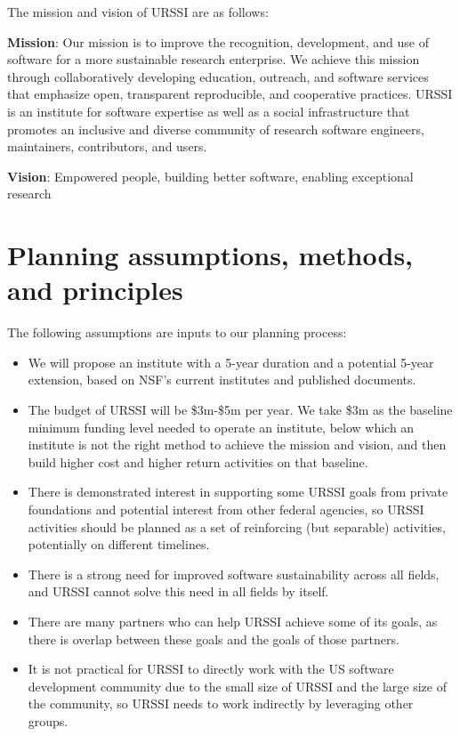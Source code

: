\documentclass[
]{book}
\begin{document}
The mission and vision of URSSI are as follows:

\textbf{Mission}: Our mission is to improve the recognition, development, and use of
software for a more sustainable research enterprise. We achieve this mission
through collaboratively developing education, outreach, and software services
that emphasize open, transparent reproducible, and cooperative practices. URSSI
is an institute for software expertise as well as a social infrastructure that
promotes an inclusive and diverse community of research software engineers,
maintainers, contributors, and users.

\textbf{Vision}: Empowered people, building better software, enabling exceptional research

\hypertarget{planning-assumptions-methods-and-principles}{%
\section{Planning assumptions, methods, and principles}\label{planning-assumptions-methods-and-principles}}

The following assumptions are inputs to our planning process:

\begin{itemize}
\item
  We will propose an institute with a 5-year duration and a potential 5-year
  extension, based on NSF's current institutes and published documents.
\item
  The budget of URSSI will be \$3m-\$5m per year. We take \$3m as the baseline
  minimum funding level needed to operate an institute, below which an institute
  is not the right method to achieve the mission and vision, and then build higher
  cost and higher return activities on that baseline.
\item
  There is demonstrated interest in supporting some URSSI goals from private
  foundations and potential interest from other federal agencies, so URSSI
  activities should be planned as a set of reinforcing (but separable) activities,
  potentially on different timelines.
\item
  There is a strong need for improved software sustainability across all fields,
  and URSSI cannot solve this need in all fields by itself.
\item
  There are many partners who can help URSSI achieve some of its goals, as there
  is overlap between these goals and the goals of those partners.
\item
  It is not practical for URSSI to directly work with the US software development
  community due to the small size of URSSI and the large size of the community, so
  URSSI needs to work indirectly by leveraging other groups.
\end{itemize}
\end{document}
